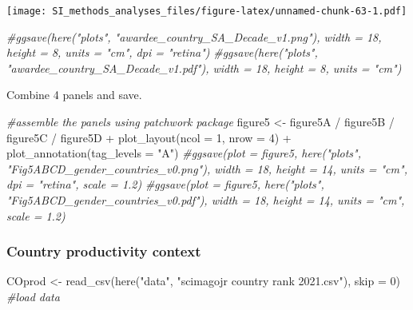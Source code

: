 \documentclass[
]{article}
\newenvironment{Shaded}{\begin{snugshade}}{\end{snugshade}}
\newcommand{\AttributeTok}[1]{\textcolor[rgb]{0.77,0.63,0.00}{#1}}
\newcommand{\CommentTok}[1]{\textcolor[rgb]{0.56,0.35,0.01}{\textit{#1}}}
\newcommand{\DecValTok}[1]{\textcolor[rgb]{0.00,0.00,0.81}{#1}}
\newcommand{\FunctionTok}[1]{\textcolor[rgb]{0.00,0.00,0.00}{#1}}
\newcommand{\NormalTok}[1]{#1}
\newcommand{\OtherTok}[1]{\textcolor[rgb]{0.56,0.35,0.01}{#1}}
\newcommand{\SpecialCharTok}[1]{\textcolor[rgb]{0.00,0.00,0.00}{#1}}
\newcommand{\StringTok}[1]{\textcolor[rgb]{0.31,0.60,0.02}{#1}}
\begin{document}
\texttt{[image: SI\_methods\_analyses\_files/figure-latex/unnamed-chunk-63-1.pdf]}

\begin{Shaded}
\begin{Highlighting}[]
\CommentTok{\#ggsave(here("plots", "awardee\_country\_SA\_Decade\_v1.png"), width = 18, height = 8, units = "cm", dpi = "retina")}
\CommentTok{\#ggsave(here("plots", "awardee\_country\_SA\_Decade\_v1.pdf"), width = 18, height = 8, units = "cm")}
\end{Highlighting}
\end{Shaded}

Combine 4 panels and save.

\begin{Shaded}
\begin{Highlighting}[]
\CommentTok{\#assemble the panels using patchwork package}
\NormalTok{figure5 }\OtherTok{\textless{}{-}}\NormalTok{ figure5A }\SpecialCharTok{/}\NormalTok{ figure5B }\SpecialCharTok{/}\NormalTok{ figure5C }\SpecialCharTok{/}\NormalTok{ figure5D }\SpecialCharTok{+} 
  \FunctionTok{plot\_layout}\NormalTok{(}\AttributeTok{ncol =} \DecValTok{1}\NormalTok{, }\AttributeTok{nrow =} \DecValTok{4}\NormalTok{) }\SpecialCharTok{+}
  \FunctionTok{plot\_annotation}\NormalTok{(}\AttributeTok{tag\_levels =} \StringTok{"A"}\NormalTok{)}
\CommentTok{\#ggsave(plot = figure5, here("plots", "Fig5ABCD\_gender\_countries\_v0.png"), width = 18, height = 14, units = "cm", dpi = "retina", scale = 1.2)}
\CommentTok{\#ggsave(plot = figure5, here("plots", "Fig5ABCD\_gender\_countries\_v0.pdf"), width = 18, height = 14, units = "cm", scale = 1.2)}
\end{Highlighting}
\end{Shaded}

\hypertarget{country-productivity-context}{%
\subsubsection{Country productivity
context}\label{country-productivity-context}}

\begin{Shaded}
\begin{Highlighting}[]
\NormalTok{COprod }\OtherTok{\textless{}{-}} \FunctionTok{read\_csv}\NormalTok{(}\FunctionTok{here}\NormalTok{(}\StringTok{"data"}\NormalTok{, }\StringTok{"scimagojr country rank 2021.csv"}\NormalTok{), }\AttributeTok{skip =} \DecValTok{0}\NormalTok{) }\CommentTok{\#load data}
\end{Highlighting}
\end{Shaded}
\end{document}
